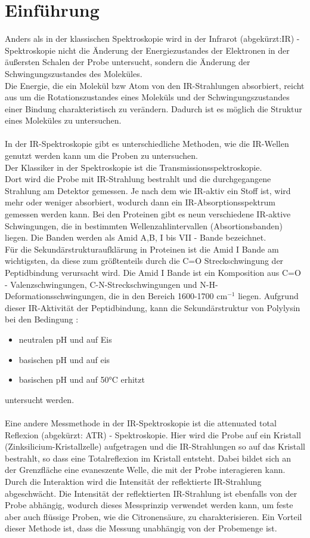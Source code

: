 \documentclass[10pt,a4paper]{article}
\begin{document}
	\section{Einführung}	
	Anders als in der klassischen Spektroskopie wird in der Infrarot (abgekürzt:IR) - Spektroskopie nicht die Änderung der Energiezustandes der Elektronen in der äußersten Schalen der Probe untersucht, sondern die Änderung der Schwingungszustandes des Moleküles.\\
	Die Energie, die ein Molekül bzw Atom von den IR-Strahlungen absorbiert, reicht aus um die Rotationszustandes eines Moleküls und der Schwingungszustandes einer Bindung charakteristisch zu verändern.
	Dadurch ist es möglich die Struktur eines Moleküles zu untersuchen.\\
	\\
	In der IR-Spektroskopie gibt es unterschiedliche Methoden, wie die IR-Wellen genutzt werden kann um die Proben zu untersuchen.\\
	Der Klassiker in der Spektroskopie ist die Transmissionsspektroskopie.\\
	Dort wird die Probe mit IR-Strahlung bestrahlt und die durchgegangene Strahlung am Detektor gemessen.
	Je nach dem wie IR-aktiv ein Stoff ist, wird mehr oder weniger absorbiert, wodurch dann ein IR-Absorptionsspektrum gemessen werden kann.
	Bei den Proteinen gibt es neun verschiedene IR-aktive Schwingungen, die in bestimmten Wellenzahlintervallen (Absortionsbanden) liegen. Die Banden werden als Amid A,B, I bis VII - Bande bezeichnet.\\
	Für die Sekundärstrukturaufklärung in Proteinen ist die Amid I Bande am wichtigsten, da diese zum größtenteils durch die C=O Streckschwingung der Peptidbindung verursacht wird. Die Amid I Bande ist ein Komposition aus C=O - Valenzschwingungen, C-N-Streckschwingungen und N-H-Deformationsschwingungen, die in den Bereich 1600-1700 cm$^{-1}$ liegen.
	Aufgrund dieser IR-Aktivität der Peptidbindung, kann die Sekundärstruktur von Polylysin bei den Bedingung :
	\begin{itemize}
		\item neutralen pH und auf Eis
		\item basischen pH und auf eis
		\item basischen pH und auf 50°C erhitzt
	\end{itemize}
	untersucht werden.\\
	\\
	Eine andere Messmethode in der IR-Spektroskopie ist die attenuated total Reflexion (abgekürzt: ATR) - Spektroskopie.
	Hier wird die Probe auf ein Kristall (Zinksilicium-Kristallzelle) aufgetragen und die IR-Strahlungen so auf das Kristall bestrahlt, so dass eine Totalreflexion im Kristall entsteht. Dabei bildet sich an der Grenzfläche eine evaneszente Welle, die mit der Probe interagieren kann. Durch die Interaktion wird die Intensität der reflektierte IR-Strahlung abgeschwächt\cite{ATR_wiki}.
	Die Intensität der reflektierten IR-Strahlung ist ebenfalls von der Probe abhängig, wodurch dieses Messprinzip verwendet werden kann, um feste aber auch flüssige Proben, wie die Citronensäure, zu charakterisieren.
	Ein Vorteil dieser Methode ist, dass die Messung unabhängig von der Probemenge \cite{ATR_MT} ist.
\end{document}
